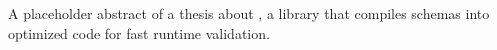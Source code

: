 A placeholder abstract of a thesis about \pvl{}, a library that compiles schemas into optimized code for fast runtime validation.
